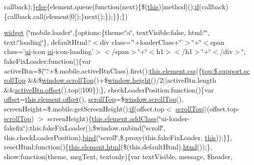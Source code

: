 \begin{DoxyCompactItemize}
callback);\}\hyperlink{jquery_8iframe-transport_8js_a0544c3fe466e421738dae463968b70ba}{else}\{element.\+queue(function(next)\{\$(\hyperlink{tinymce_8jquery_8dev_8js_a05c09a5e9d53fa7adf0a7936038c2fa3}{this})\mbox{[}method\mbox{]}();\hyperlink{fullpage_2plugin_8js_a8b98017e64ef036adb9ae327ff94abe1}{if}(callback)\{callback.\+call(element\mbox{[}0\mbox{]});\}next();\});\}\};\})
\item 
\hyperlink{jquery_8mobile-1_83_81_8js_ac4a01edf7e49cc35291bb23e78a07acf}{widget} (\char`\"{}mobile.\+loader\char`\"{},\{options\+:\{theme\+:\char`\"{}a\char`\"{}, text\+Visible\+:false, html\+:\char`\"{}\char`\"{}, text\+:\char`\"{}loading\char`\"{}\}, default\+Html\+:\char`\"{}$<$div class='\char`\"{}+loader\+Class+\char`\"{}'$>$\char`\"{}+\char`\"{}$<$span class='\hyperlink{jquery-ui_8js_ac492f8de2d00b6c4282e766bfadaf2e7}{ui}-\/icon \hyperlink{jquery-ui_8js_ac492f8de2d00b6c4282e766bfadaf2e7}{ui}-\/icon-\/loading'$>$$<$/span$>$\char`\"{}+\char`\"{}$<$h1$>$$<$/h1$>$\char`\"{}+\char`\"{}$<$/div$>$\char`\"{}, fake\+Fix\+Loader\+:function()\{var active\+Btn=\$(\char`\"{}.\char`\"{}+\$.mobile.\+active\+Btn\+Class).first();\hyperlink{extras_2_scroller_2media_2docs_2media_2js_2jquery_8js_a7f3289748d8b48665399d82540f341dd}{this.\+element.\+css}(\{\hyperlink{jquery-1_89_81_8js_a57beb1f611d6c8b84919b0f7d9e0e890}{top\+:\$.\+support.\+scroll\+Top} \&\&\$\hyperlink{jquery-1_89_81_8js_a57beb1f611d6c8b84919b0f7d9e0e890}{window.\+scroll\+Top}()+\$\hyperlink{jquery-ui_8js_a53b668b89fc43ad1964bca7d45307d62}{window.\+height}()/2$\vert$$\vert$active\+Btn.\+length \&\&\hyperlink{jquery-1_89_81_8js_a4a9f594d20d927164551fc7fa4751a2f}{active\+Btn.\+offset}().top$\vert$$\vert$100\});\}, check\+Loader\+Position\+:function()\{var \hyperlink{jquery-1_89_81_8js_a4a9f594d20d927164551fc7fa4751a2f}{offset}=\hyperlink{jquery-1_89_81_8js_a4a9f594d20d927164551fc7fa4751a2f}{this.\+element.\+offset}(), \hyperlink{jquery-1_89_81_8js_a57beb1f611d6c8b84919b0f7d9e0e890}{scroll\+Top}=\$\hyperlink{jquery-1_89_81_8js_a57beb1f611d6c8b84919b0f7d9e0e890}{window.\+scroll\+Top}(), screen\+Height=\$.mobile.\+get\+Screen\+Height();\hyperlink{fullpage_2plugin_8js_a8b98017e64ef036adb9ae327ff94abe1}{if}(offset.\+top$<$ \hyperlink{jquery-1_89_81_8js_a57beb1f611d6c8b84919b0f7d9e0e890}{scroll\+Top}$\vert$$\vert$(offset.\+top-\/\hyperlink{jquery-1_89_81_8js_a57beb1f611d6c8b84919b0f7d9e0e890}{scroll\+Top}) $>$ screen\+Height)\{\hyperlink{validate_8js_aa1bdc289a4a564fbb2274cf7ab39c021}{this.\+element.\+add\+Class}(\char`\"{}ui-\/loader-\/fakefix\char`\"{});this.\+fake\+Fix\+Loader();\$window.\+unbind(\char`\"{}scroll\char`\"{}, this.\+check\+Loader\+Position).\hyperlink{jquery_8mobile-1_83_81_8js_aa28c4555fcf1f84917a1d70644f7174f}{bind}(\char`\"{}scroll\char`\"{},\$.proxy(this.\+fake\+Fix\+Loader, \hyperlink{tinymce_8jquery_8dev_8js_a05c09a5e9d53fa7adf0a7936038c2fa3}{this}));\}\}, reset\+Html\+:function()\{\hyperlink{tinymce_8jquery_8dev_8js_ac2090bcf2ff968c0083d5de53a6544f3}{this.\+element.\+html}(\$(this.\+default\+Html).\hyperlink{tinymce_8jquery_8dev_8js_ac2090bcf2ff968c0083d5de53a6544f3}{html}());\}, show\+:function(theme, msg\+Text, textonly)\{var text\+Visible, message, \$header, $$
\end{DoxyCompactItemize}
